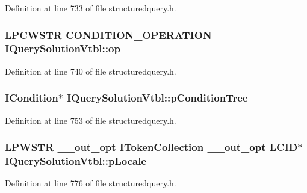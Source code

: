 Definition at line 733 of file structuredquery.\+h.

\subsubsection[{\texorpdfstring{op}{op}}]{ {\bf L\+P\+C\+W\+S\+TR} {\bf C\+O\+N\+D\+I\+T\+I\+O\+N\+\_\+\+O\+P\+E\+R\+A\+T\+I\+ON} I\+Query\+Solution\+Vtbl\+::op}\hypertarget{struct_i_query_solution_vtbl_ad1f21b5da07b1e7be603eab797bdd6f5}{}\label{struct_i_query_solution_vtbl_ad1f21b5da07b1e7be603eab797bdd6f5}


Definition at line 740 of file structuredquery.\+h.

\subsubsection[{\texorpdfstring{p\+Condition\+Tree}{pConditionTree}}]{ {\bf I\+Condition}$\ast$ I\+Query\+Solution\+Vtbl\+::p\+Condition\+Tree}\hypertarget{struct_i_query_solution_vtbl_aca6ec60a3e9bc433b0fbf500423320bd}{}\label{struct_i_query_solution_vtbl_aca6ec60a3e9bc433b0fbf500423320bd}


Definition at line 753 of file structuredquery.\+h.

\subsubsection[{\texorpdfstring{p\+Locale}{pLocale}}]{ {\bf L\+P\+W\+S\+TR} {\bf \+\_\+\+\_\+out\+\_\+opt} {\bf I\+Token\+Collection} {\bf \+\_\+\+\_\+out\+\_\+opt} {\bf L\+C\+ID}$\ast$ I\+Query\+Solution\+Vtbl\+::p\+Locale}\hypertarget{struct_i_query_solution_vtbl_ad5990b0902bfd2a012612544d0ff0774}{}\label{struct_i_query_solution_vtbl_ad5990b0902bfd2a012612544d0ff0774}


Definition at line 776 of file structuredquery.\+h.

